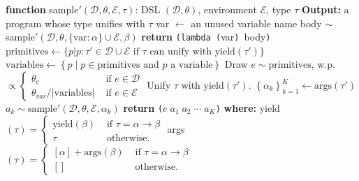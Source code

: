 \documentclass{article}
\newcommand{\code}[1]{{\footnotesize\texttt{#1}}}
\begin{document}
\begin{algorithm}
\begin{algorithmic}[1]
    \Statex
    \State \textbf{function} sample$'(\mathcal{D}, \theta, \mathcal{E}, \tau)$:
     DSL $(\mathcal{D},\theta)$, environment $\mathcal{E}$, type $\tau$
    \State \textbf{Output:} a program whose type unifies with $\tau$
    \If{$\tau = \alpha\to\beta$}
    \State var $\gets$ an unused variable name
    \State body $\sim$ sample$'(\mathcal{D},\theta,\{\text{var}:\alpha\}\cup\mathcal{E},\beta)$
    \State \textbf{return} \code{(lambda (}var\code{) }body\code{)}
    \Else{}
    \State $\text{primitives} \gets \{p | p: \tau' \in \mathcal{D}\cup\mathcal{E}$
    $\text{if }\tau\text{ can unify with yield}(\tau') \}$
    \State $\text{variables}\gets\left\{p\;|\;p\in \text{primitives}\text{ and }p\text{ a variable} \right\}$
    \State Draw $e\sim \text{primitives}$, w.p. $\propto\begin{cases}
    \theta_e&\text{ if }e\in \mathcal{D}\\
    \theta_{var}/|\text{variables}|&\text{ if }e\in \mathcal{E}
    \end{cases}$
    \State Unify $\tau$ with yield$(\tau')$.
    \State $\left\{\alpha_k \right\}_{k = 1}^K\gets\text{args}(\tau')$ 
    \State $a_k\sim\text{sample}'(\mathcal{D},\theta,\mathcal{E},\alpha_k)$
    \EndFor
    \State \textbf{return} \code{(}$e\;a_1\; a_2\; \cdots\; a_K$\code{)}
    \EndIf
    \Statex
    \Statex\textbf{where:}
    \State yield$(\tau) = \begin{cases}
      \text{yield}(\beta)   &\text{ if }\tau = \alpha\to \beta\\
      \tau   &\text{ otherwise.}
    \end{cases}$ 
    \State  args$(\tau) = \begin{cases}
      [\alpha] + \text{args}(\beta)   &\text{ if }\tau = \alpha\to \beta\\
      []   &\text{ otherwise.}
    \end{cases}$
  \end{algorithmic}
\end{algorithm}
\end{document}
